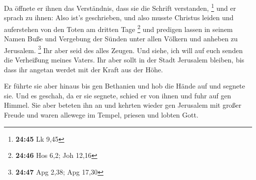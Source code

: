  Da öffnete er ihnen das Verständnis, dass sie die Schrift
verstanden, \footnote{\textbf{24:45} Lk 9,45}  und er
sprach zu ihnen: Also ist's geschrieben, und also musste Christus leiden
und auferstehen von den Toten am dritten Tage \footnote{\textbf{24:46}
  Hos 6,2; Joh 12,16}  und predigen lassen in seinem Namen
Buße und Vergebung der Sünden unter allen Völkern und anheben zu
Jerusalem. \footnote{\textbf{24:47} Apg 2,38; Apg 17,30} 
Ihr aber seid des alles Zeugen.  Und siehe, ich will auf
euch senden die Verheißung meines Vaters. Ihr aber sollt in der Stadt
Jerusalem bleiben, bis dass ihr angetan werdet mit der Kraft aus der
Höhe.

 Er führte sie aber hinaus bis gen Bethanien und hob die
Hände auf und segnete sie.  Und es geschah, da er sie
segnete, schied er von ihnen und fuhr auf gen Himmel.  Sie
aber beteten ihn an und kehrten wieder gen Jerusalem mit großer Freude
 und waren allewege im Tempel, priesen und lobten Gott.
